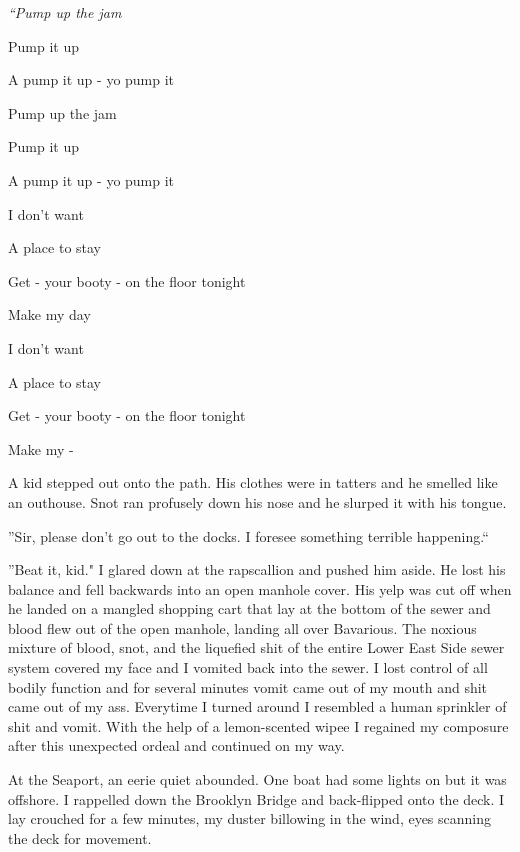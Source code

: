 {\em ``Pump up the jam

Pump it up

A pump it up - yo pump it



Pump up the jam

Pump it up

A pump it up - yo pump it



I don't want

A place to stay

Get - your booty - on the floor tonight

Make my day



I don't want

A place to stay

Get - your booty - on the floor tonight

Make my -}



A kid stepped out onto the path. His clothes were in tatters and he
smelled like an outhouse. Snot ran profusely down his nose and he
slurped it with his tongue.



''Sir, please don't go out to the docks. I foresee something
terrible happening.``



''Beat it, kid." I glared down at the rapscallion and pushed him
aside. He lost his balance and fell backwards into an open manhole
cover. His yelp was cut off when he landed on a mangled shopping
cart that lay at the bottom of the sewer and blood flew out of the
open manhole, landing all over Bavarious. The noxious mixture of
blood, snot, and the liquefied shit of the entire Lower East Side
sewer system covered my face and I vomited back into the sewer. I
lost control of all bodily function and for several minutes vomit
came out of my mouth and shit came out of my ass. Everytime I
turned around I resembled a human sprinkler of shit and vomit. With
the help of a lemon-scented wipee I regained my composure after
this unexpected ordeal and continued on my way.



At the Seaport, an eerie quiet abounded. One boat had some lights
on but it was offshore. I rappelled down the Brooklyn Bridge and
back-flipped onto the deck. I lay crouched for a few minutes, my
duster billowing in the wind, eyes scanning the deck for
movement.



